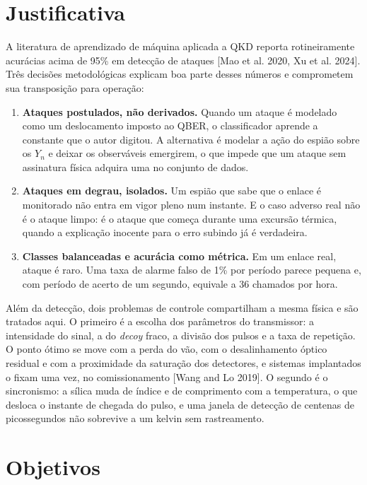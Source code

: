 \documentclass[12pt]{article}
\begin{document}
\section{Justificativa}

A literatura de aprendizado de máquina aplicada a QKD reporta rotineiramente
acurácias acima de 95\% em detecção de ataques [Mao et al. 2020, Xu et al. 2024].
Três decisões metodológicas explicam boa parte desses números e comprometem sua
transposição para operação:

\begin{enumerate}[leftmargin=1.6em]
  \item \textbf{Ataques postulados, não derivados.} Quando um ataque é modelado
  como um deslocamento imposto ao QBER, o classificador aprende a constante que o
  autor digitou. A alternativa é modelar a ação do espião sobre os $Y_n$ e deixar
  os observáveis emergirem, o que impede que um ataque sem assinatura física
  adquira uma no conjunto de dados.
  \item \textbf{Ataques em degrau, isolados.} Um espião que sabe que o enlace é
  monitorado não entra em vigor pleno num instante. E o caso adverso real não é o
  ataque limpo: é o ataque que começa durante uma excursão térmica, quando a
  explicação inocente para o erro subindo já é verdadeira.
  \item \textbf{Classes balanceadas e acurácia como métrica.} Em um enlace real,
  ataque é raro. Uma taxa de alarme falso de 1\% por período parece pequena e, com
  período de acerto de um segundo, equivale a 36 chamados por hora.
\end{enumerate}

Além da detecção, dois problemas de controle compartilham a mesma física e são
tratados aqui. O primeiro é a escolha dos parâmetros do transmissor: a
intensidade do sinal, a do \emph{decoy} fraco, a divisão dos pulsos e a taxa de
repetição. O ponto ótimo se move com a perda do vão, com o desalinhamento óptico
residual e com a proximidade da saturação dos detectores, e sistemas implantados
o fixam uma vez, no comissionamento [Wang and Lo 2019]. O segundo é o sincronismo:
a sílica muda de índice e de comprimento com a temperatura, o que desloca o
instante de chegada do pulso, e uma janela de detecção de centenas de
picossegundos não sobrevive a um kelvin sem rastreamento.

\section{Objetivos}
\end{document}
